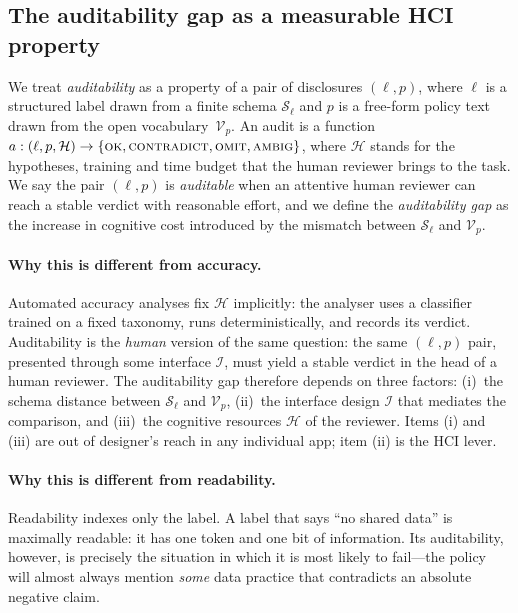 \documentclass[11pt,a4paper]{article}
\begin{document}
\subsection{The auditability gap as a measurable HCI property}
\label{sec:concept}
We treat \emph{auditability} as a property of a pair of disclosures
$(\ell, p)$, where $\ell$ is a structured label drawn from a finite
schema $\mathcal{S}_{\ell}$ and $p$ is a free-form policy text drawn from
the open vocabulary~$\mathcal{V}_{p}$. An audit is a function
$a : (\ell, p, \mathcal{H}) \to \{\textsc{ok}, \textsc{contradict},
\textsc{omit}, \textsc{ambig}\}$, where $\mathcal{H}$ stands for the
hypotheses, training and time budget that the human reviewer brings to the
task. We say the pair $(\ell, p)$ is \emph{auditable} when an attentive
human reviewer can reach a stable verdict with reasonable effort, and we
define the \emph{auditability gap} as the increase in cognitive cost
introduced by the mismatch between $\mathcal{S}_{\ell}$ and
$\mathcal{V}_{p}$.

\paragraph{Why this is different from accuracy.}
Automated accuracy analyses fix $\mathcal{H}$ implicitly: the analyser uses
a classifier trained on a fixed taxonomy, runs deterministically, and
records its verdict. Auditability is the \emph{human} version of the same
question: the same $(\ell, p)$ pair, presented through some interface
$\mathcal{I}$, must yield a stable verdict in the head of a human reviewer.
The auditability gap therefore depends on three factors: (i)~the schema
distance between $\mathcal{S}_{\ell}$ and $\mathcal{V}_{p}$,
(ii)~the interface design $\mathcal{I}$ that mediates the comparison, and
(iii)~the cognitive resources $\mathcal{H}$ of the reviewer. Items (i) and
(iii) are out of designer's reach in any individual app; item (ii) is the
HCI lever.

\paragraph{Why this is different from readability.}
Readability indexes only the label. A label that says ``no shared data''
is maximally readable: it has one token and one bit of information. Its
auditability, however, is precisely the situation in which it is most
likely to fail---the policy will almost always mention \emph{some}
data practice that contradicts an absolute negative claim.
\end{document}
